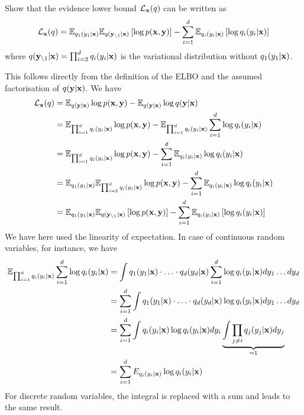 \begin{exenumerate}
\item Show that the evidence lower bound $\mathcal{L}_{\mathbf{x}}(q)$ can be written as
\begin{equation}
  \mathcal{L}_{\mathbf{x}}(q) = \mathbb{E}_{q_1(y_1|\mathbf{x})} \mathbb{E}_{q(\mathbf{y}_{\setminus 1}|\mathbf{x})}\left[ \log p(\mathbf{x},\mathbf{y})\right] - \sum_{i=1}^d \mathbb{E}_{q_i(y_i|\mathbf{x})} \left[\log q_i(y_i|\mathbf{x})\right]
\end{equation}
where $q(\mathbf{y}_{\setminus 1}|\mathbf{x}) = \prod_{i=2}^d q_i(y_i | \mathbf{x})$ is the variational distribution without $q_1(y_1|\mathbf{x})$.

\begin{solution}
  This follows directly from the definition of the ELBO and the assumed factorisation of $q(\mathbf{y}|\mathbf{x})$. We have
  \begin{align}
    \mathcal{L}_{\mathbf{x}}(q) &= \mathbb{E}_{q(\mathbf{y}|\mathbf{x})} \log p(\mathbf{x},\mathbf{y}) - \mathbb{E}_{q(\mathbf{y}|\mathbf{x})} \log q(\mathbf{y}|\mathbf{x}) \\
    & = \mathbb{E}_{ \prod_{i=1}^d q_i(y_i | \mathbf{x})}  \log p(\mathbf{x},\mathbf{y}) - \mathbb{E}_{ \prod_{i=1}^d q_i(y_i | \mathbf{x})} \sum_{i=1}^d \log q_i(y_i|\mathbf{x}) \\
    & = \mathbb{E}_{ \prod_{i=1}^d q_i(y_i | \mathbf{x})}  \log p(\mathbf{x},\mathbf{y}) - \sum_{i=1}^d  \mathbb{E}_{q_i(y_i | \mathbf{x})} \log q_i(y_i|\mathbf{x}) \\
    & = \mathbb{E}_{q_1(y_1|\mathbf{x})} \mathbb{E}_{ \prod_{i=2}^d q_i(y_i | \mathbf{x})}  \log p(\mathbf{x},\mathbf{y}) - \sum_{i=1}^d  \mathbb{E}_{q_i(y_i | \mathbf{x})} \log q_i(y_i|\mathbf{x})\\
    & = \mathbb{E}_{q_1(y_1|\mathbf{x})} \mathbb{E}_{q(\mathbf{y}_{\setminus 1}|\mathbf{x})}\left[ \log p(\mathbf{x},\mathbf{y})\right] - \sum_{i=1}^d \mathbb{E}_{q_i(y_i|\mathbf{x})} \left[\log q_i(y_i|\mathbf{x})\right]
  \end{align}
  We have here used the linearity of expectation. In case of continuous random variables, for instance, we have
  \begin{align}
 \mathbb{E}_{ \prod_{i=1}^d q_i(y_i | \mathbf{x})} \sum_{i=1}^d \log q_i(y_i|\mathbf{x}) & = \int  q_1(y_1 | \mathbf{x})\cdot \ldots\cdot q_d(y_d|\mathbf{x})  \sum_{i=1}^d \log q_i(y_i|\mathbf{x}) d y_1\ldots d y_d\\
 & =  \sum_{i=1}^d \int q_1(y_1 | \mathbf{x})\cdot \ldots \cdot q_d(y_d|\mathbf{x}) \log q_i(y_i|\mathbf{x}) d y_1\ldots d y_d\\
 & =  \sum_{i=1}^d \int q_i(y_i | \mathbf{x})\log q_i(y_i|\mathbf{x}) d y_i \underbrace{\int \prod_{j\neq i} q_j(y_j|\mathbf{x}) d y_j}_{=1}\\
 & =  \sum_{i=1}^d E_{q_i(y_i|\mathbf{x})} \log q_i(y_i|\mathbf{x})
\end{align}
For discrete random variables, the integral is replaced with a sum and leads to the same result.

\end{solution}


\end{exenumerate}
